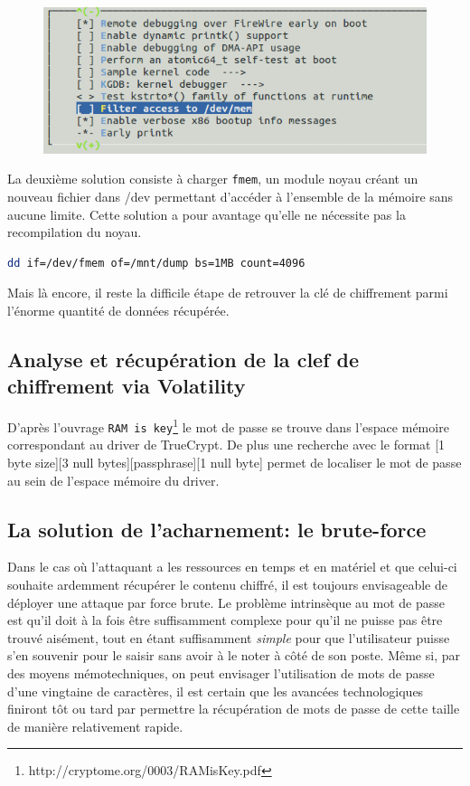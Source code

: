 \documentclass[12pt,a4paper]{article}
\begin{document}
\begin{figure}[H]
	\begin{center}
		\includegraphics[width=15cm]{img/kernel.png}
	\end{center}
\end{figure}



La deuxième solution consiste à charger \texttt{fmem}, un module noyau créant
un nouveau fichier dans /dev permettant d'accéder à l'ensemble de la mémoire
sans aucune limite. Cette solution a pour avantage qu'elle ne nécessite pas la
recompilation du noyau.

\begin{lstlisting}[language=Bash]
dd if=/dev/fmem of=/mnt/dump bs=1MB count=4096
\end{lstlisting}

Mais là encore, il reste la difficile étape de retrouver la clé de chiffrement 
parmi l'énorme quantité de données récupérée.


\subsection{Analyse et récupération de la clef de chiffrement via Volatility}
D'après l'ouvrage \texttt{RAM is
key}\footnote{http://cryptome.org/0003/RAMisKey.pdf} le mot de passe se trouve
dans l'espace mémoire correspondant au driver de TrueCrypt. De plus une
recherche avec le format [1 byte size][3 null bytes][passphrase][1 null byte]
permet de localiser le mot de passe au sein de l'espace mémoire du driver.


\subsection{La solution de l'acharnement: le brute-force}

Dans le cas où l'attaquant a les ressources en temps et en matériel et que
celui-ci souhaite ardemment récupérer le contenu chiffré, il est toujours
envisageable de déployer une attaque par force brute. Le problème intrinsèque
au mot de passe est qu'il doit à la fois être suffisamment complexe pour qu'il
ne puisse pas être trouvé aisément, tout en étant suffisamment \textit{simple}
pour que l'utilisateur puisse s'en souvenir pour le saisir sans avoir à le
noter à côté de son poste. Même si, par des moyens mémotechniques, on peut
envisager l'utilisation de mots de passe d'une vingtaine de caractères, il est
certain que les avancées technologiques finiront tôt ou tard par permettre la
récupération de mots de passe de cette taille de manière relativement rapide.
\end{document}
